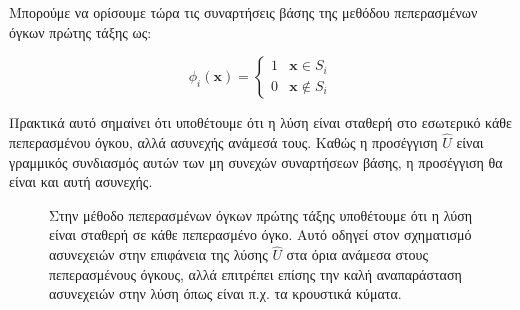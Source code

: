 Μπορούμε να ορίσουμε τώρα τις συναρτήσεις βάσης της μεθόδου πεπερασμένων όγκων πρώτης τάξης ως:

\begin{equation}
    \phi_i(\mathbf{x}) =
        \begin{cases}
            1 & \mathbf{x} \in S_i \\
            0 & \mathbf{x} \notin S_i
        \end{cases}
\end{equation}

Πρακτικά αυτό σημαίνει ότι υποθέτουμε ότι η λύση είναι σταθερή στο εσωτερικό κάθε πεπερασμένου όγκου, αλλά ασυνεχής ανάμεσά τους.
Καθώς η προσέγγιση $\hat{U}$ είναι γραμμικός συνδιασμός αυτών των μη συνεχών συναρτήσεων βάσης, η προσέγγιση θα είναι και αυτή ασυνεχής.

\begin{figure}
    \centering
    \caption{Στην μέθοδο πεπερασμένων όγκων πρώτης τάξης υποθέτουμε ότι η λύση είναι σταθερή σε κάθε πεπερασμένο όγκο. Αυτό οδηγεί στον σχηματισμό ασυνεχειών στην επιφάνεια της λύσης $\hat{U}$ στα όρια ανάμεσα στους πεπερασμένους όγκους, αλλά επιτρέπει επίσης την καλή αναπαράσταση ασυνεχειών στην λύση όπως είναι π.χ. τα κρουστικά κύματα.}
    \label{fig:fvm-basis}
\end{figure}

